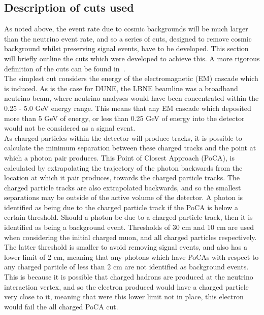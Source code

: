 \subsection{Description of cuts used} \label{sec:SurfCutList}
As noted above, the event rate due to cosmic backgrounds will be much larger than the neutrino event rate, and so a series of cuts, designed to remove cosmic background whilst preserving signal events, have to be developed. This section will briefly outline the cuts which were developed to achieve this. A more rigorous definition of the cuts can be found in~\citep{MartinsThesis}. \\

The simplest cut considers the energy of the electromagnetic (EM) cascade which is induced. As is the case for DUNE, the LBNE beamline was a broadband neutrino beam, where neutrino analyses would have been concentrated within the 0.25 - 5.0 GeV energy range. This means that any EM cascade which deposited more than 5 GeV of energy, or less than 0.25 GeV of energy into the detector would not be considered as a signal event. \\

As charged particles within the detector will produce tracks, it is possible to calculate the minimum separation between these charged tracks and the point at which a photon pair produces. This Point of Closest Approach (PoCA), is calculated by extrapolating the trajectory of the photon backwards from the location at which it pair produces, towards the charged particle tracks. The charged particle tracks are also extrapolated backwards, and so the smallest separations may be outside of the active volume of the detector. A photon is identified as being due to the charged particle track if the PoCA is below a certain threshold. Should a photon be due to a charged particle track, then it is identified as being a background event. Thresholds of 30 cm and 10 cm are used when considering the initial charged muon, and all charged particles respectively. The latter threshold is smaller to avoid removing signal events, and also has a lower limit of 2 cm, meaning that any photons which have PoCAs with respect to any charged particle of less than 2 cm are not identified as background events. This is because it is possible that charged hadrons are produced at the neutrino interaction vertex, and so the electron produced would have a charged particle very close to it, meaning that were this lower limit not in place, this electron would fail the all charged PoCA cut. \\ 

